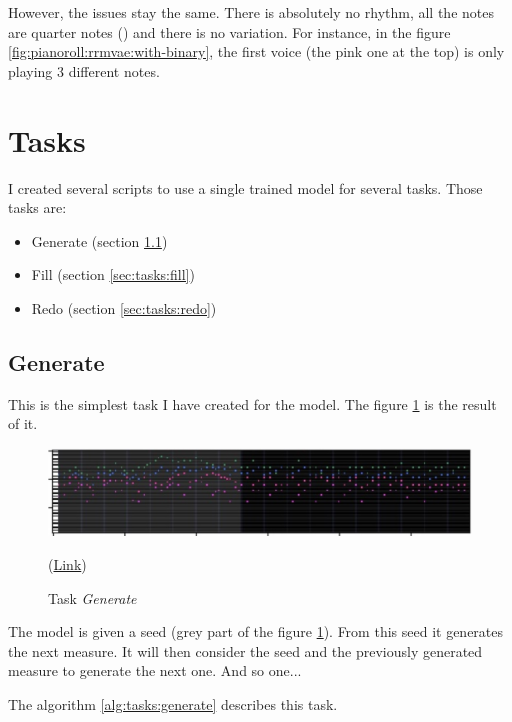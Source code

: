 \documentclass[12pt]{report}
\begin{document}
However, the issues stay the same.
There is absolutely no rhythm, all the notes are quarter notes (\musQuarter) and there is no variation.
For instance, in the figure \ref{fig:pianoroll:rrmvae:with-binary}, the first voice (the pink one at the top) is only playing 3 different notes.

\section{Tasks}
\label{sec:tasks}

I created several scripts to use a single trained model for several tasks.
Those tasks are:
\begin{itemize}
    \item Generate (section \ref{sec:tasks:generate})
    \item Fill (section \ref{sec:tasks:fill})
    \item Redo (section \ref{sec:tasks:redo})
\end{itemize}


\subsection{Generate}
\label{sec:tasks:generate}

This is the simplest task I have created for the model.
The figure \ref{fig:tasks:generate} is the result of it.

\begin{figure}[htbp]
    \centering
    \includegraphics[width=\textwidth]{images/generated_midis/tasks/generate/generate.jpg}
    \caption{Task \textit{Generate}}
    (\href{https://github.com/ValentinVignal/midiGenerator/blob/master/samples/tasks/generate.mid}{Link})
    \label{fig:tasks:generate}
\end{figure}

The model is given a seed (grey part of the figure \ref{fig:tasks:generate}).
From this seed it generates the next measure.
It will then consider the seed and the previously generated measure to generate the next one.
And so one...

The algorithm \ref{alg:tasks:generate} describes this task.
\end{document}
